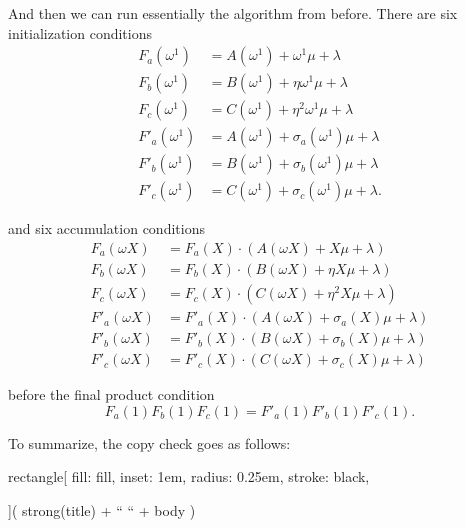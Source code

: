 \documentclass{article}
\begin{document}
And then we can run essentially the algorithm from before. There are six
initialization conditions \[\begin{aligned}
F_{a}\left( \omega^{1} \right) & = A\left( \omega^{1} \right) + \omega^{1}\mu + \lambda \\
F_{b}\left( \omega^{1} \right) & = B\left( \omega^{1} \right) + \eta\omega^{1}\mu + \lambda \\
F_{c}\left( \omega^{1} \right) & = C\left( \omega^{1} \right) + \eta^{2}\omega^{1}\mu + \lambda \\
F'_{a}\left( \omega^{1} \right) & = A\left( \omega^{1} \right) + \sigma_{a}\left( \omega^{1} \right)\mu + \lambda \\
F'_{b}\left( \omega^{1} \right) & = B\left( \omega^{1} \right) + \sigma_{b}\left( \omega^{1} \right)\mu + \lambda \\
F'_{c}\left( \omega^{1} \right) & = C\left( \omega^{1} \right) + \sigma_{c}\left( \omega^{1} \right)\mu + \lambda.
\end{aligned}\] \label{copycheck-init}{}

and six accumulation conditions \[\begin{aligned}
F_{a}(\omega X) & = F_{a}(X) \cdot \left( A(\omega X) + X\mu + \lambda \right) \\
F_{b}(\omega X) & = F_{b}(X) \cdot \left( B(\omega X) + \eta X\mu + \lambda \right) \\
F_{c}(\omega X) & = F_{c}(X) \cdot \left( C(\omega X) + \eta^{2}X\mu + \lambda \right) \\
F'_{a}(\omega X) & = F'_{a}(X) \cdot \left( A(\omega X) + \sigma_{a}(X)\mu + \lambda \right) \\
F'_{b}(\omega X) & = F'_{b}(X) \cdot \left( B(\omega X) + \sigma_{b}(X)\mu + \lambda \right) \\
F'_{c}(\omega X) & = F'_{c}(X) \cdot \left( C(\omega X) + \sigma_{c}(X)\mu + \lambda \right)
\end{aligned}\] \label{copycheck-accum}{}

before the final product condition
\[F_{a}(1)F_{b}(1)F_{c}(1) = F'_{a}(1)F'_{b}(1)F'_{c}(1).\]
\label{copycheck-final}{}

To summarize, the copy check goes as follows:

rectangle{[} fill: fill, inset: 1em, radius: 0.25em, stroke: black,

{]}( strong(title) + `` `` + body )
\end{document}
